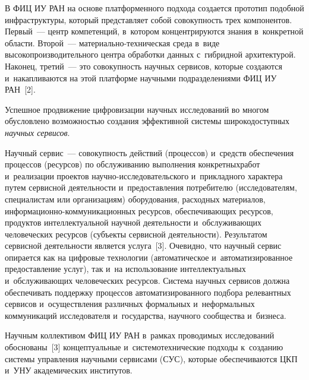 \begin{multicols}{2}
     В ФИЦ ИУ РАН на основе платформенного подхода создается 
прототип подобной инфраструктуры, который представляет собой 
совокупность трех компонентов. Первый~--- центр компетенций, в~котором 
концентрируются знания в~конкретной области. Второй~---  
ма\-те\-ри\-аль\-но-тех\-ни\-че\-ская среда в~виде высокопроизводительного 
центра обработки данных с~гибридной архитектурой. Наконец, третий~--- это 
совокупность научных сервисов, которые создаются и~накапливаются на этой 
платформе научными подразделениями ФИЦ ИУ РАН~[2].
     
     Успешное продвижение цифровизации научных исследований во 
многом обусловлено воз\-мож\-ностью создания эффективной системы 
широкодоступных \textit{научных сервисов}. 

Научный сервис~--- 
совокупность действий (процессов) и~средств обеспечения процессов 
(ресурсов) по обслуживанию выполнения конкретных\linebreak работ и~реализации 
проектов на\-уч\-но-ис\-сле\-до\-ва\-тель\-ского и~прикладного характера путем 
сервисной деятельности и~предоставления потребителю (исследователям, 
специалистам или организациям) оборудования, расходных материалов,  
ин\-фор\-ма\-ци\-он\-но-ком\-му\-ни\-ка\-ци\-он\-ных ресурсов, 
обес\-пе\-чи\-ва\-ющих ресурсов, продуктов интеллектуальной научной 
деятельности и~об\-слу\-жи\-ва\-ющих человеческих ресурсов (субъекты сервисной 
деятельности). Результатом сервисной дея\-тель\-ности является услуга~[3]. 
Очевидно, что научный сервис опирается как на цифровые технологии 
(автоматическое и~автоматизированное предоставление услуг), так и~на 
использование интеллектуальных и~обслуживающих человеческих ресурсов. 
Система научных сервисов должна обеспечивать поддержку процессов 
автоматизированного подбора релевантных сервисов и~осуществления 
различных формальных и~неформальных коммуникаций исследователя 
и~государства, научного сообщества и~бизнеса.
     
     Научным коллективом ФИЦ ИУ РАН в~рамках проводимых 
исследований обоснованы~[3] концептуальные и~системотехнические 
подходы к~созданию системы управления научными сервисами (СУС), 
которые обеспечиваются ЦКП 
и~УНУ академических институтов.
     

\end{multicols}
